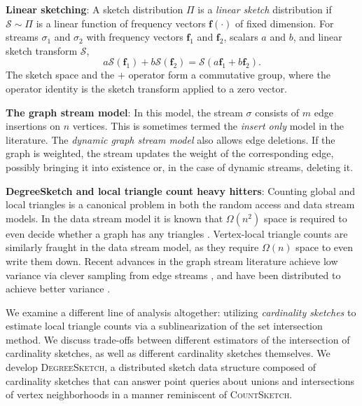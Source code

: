 \documentclass[10]{article}
\newcommand{\algoname}[1]{\textnormal{\textsc{#1}}}
\begin{document}
\noindent
\textbf{Linear sketching}:
A sketch distribution $\Pi$ is a \emph{linear sketch} distribution if $\mathcal{S} \sim \Pi$ is a linear function of frequency vectors $\mathbf{f}(\cdot)$ of fixed dimension.
%
For streams $\sigma_1$ and $\sigma_2$ with frequency vectors $\mathbf{f}_1$ and $\mathbf{f}_2$, scalars $a$ and $b$, and linear sketch transform $\mathcal{S}$, 
%
\begin{equation} \label{eq:linearity}
a\mathcal{S}(\mathbf{f}_1) + b\mathcal{S}(\mathbf{f}_2) = \mathcal{S}(a\mathbf{f}_1 + b\mathbf{f}_2).
\end{equation}
%
The sketch space and the $+$ operator form a commutative group, where the operator identity is the sketch transform applied to a zero vector.

\noindent
\textbf{The graph stream model}:
In this model, the stream $\sigma$ consists of $m$ edge insertions on $n$ vertices. 
This is sometimes termed the \emph{insert only} model in the literature.
The \emph{dynamic graph stream model} also allows edge deletions.
If the graph is weighted, the stream updates the weight of the corresponding edge, possibly bringing it into existence or, in the case of dynamic streams, deleting it.


\noindent
\textbf{DegreeSketch and local triangle count heavy hitters}:
Counting global and local triangles is a canonical problem in both the random access and data stream models. 
In the data stream model it is known that $\Omega(n^2)$ space is required to even decide whether a graph has any triangles \cite{bar2002reductions}.
Vertex-local triangle counts are similarly fraught in the data stream model, as they require $\Omega(n)$ space to even write them down. 
Recent advances in the graph stream literature achieve low variance via clever sampling from edge streams \cite{becchetti2008efficient, lim2015mascot, stefani2017triest}, and have been distributed to achieve better variance \cite{shin2018tri, shin2018dislr}.

We examine a different line of analysis altogether: utilizing \emph{cardinality sketches} to estimate local triangle counts via a sublinearization of the set intersection method.
We discuss trade-offs between different estimators of the intersection of cardinality sketches, as well as different cardinality sketches themselves.
We develop \algoname{DegreeSketch}, a distributed sketch data structure composed of cardinality sketches that can answer point queries about unions and intersections of vertex neighborhoods in a manner reminiscent of \algoname{CountSketch}.
\end{document}
